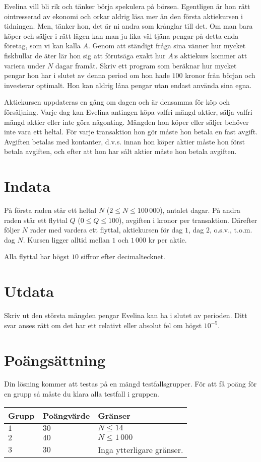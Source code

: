 Evelina vill bli rik och tänker börja spekulera på börsen.
Egentligen är hon rätt ointresserad av ekonomi och orkar aldrig läsa mer än den första aktiekursen i tidningen.
Men, tänker hon, det är ni andra som krånglar till det.
Om man bara köper och säljer i rätt lägen kan man ju lika väl tjäna pengar på detta enda företag, som vi kan kalla $A$.
Genom att ständigt fråga sina vänner hur mycket fiskbullar de äter lär hon sig att förutsäga exakt hur $A$:s aktiekurs kommer att variera under $N$ dagar framåt.
Skriv ett program som beräknar hur mycket pengar hon har i slutet av denna period om hon hade $100$ kronor från början och investerar optimalt.
Hon kan aldrig låna pengar utan endast använda sina egna.

Aktiekursen uppdateras en gång om dagen och är densamma för köp och försäljning.
Varje dag kan Evelina antingen köpa valfri mängd aktier, sälja valfri mängd aktier eller inte göra någonting.
Mängden hon köper eller säljer behöver inte vara ett heltal.
För varje transaktion hon gör måste hon betala en fast avgift.
Avgiften betalas med kontanter, d.v.s. innan hon köper aktier måste hon först betala avgiften, och efter att hon har sålt aktier måste hon betala avgiften. 

\section*{Indata}
På första raden står ett heltal $N$ ($2 \le N \le 100\,000$), antalet dagar.
På andra raden står ett flyttal $Q$ ($0 \le Q \le 100$), avgiften i kronor per transaktion.
Därefter följer $N$ rader med vardera ett flyttal, aktiekursen för dag $1$, dag $2$, o.s.v., t.o.m. dag $N$.
Kursen ligger alltid mellan $1$ och $1\,000$ kr per aktie. 

Alla flyttal har högst $10$ siffror efter decimaltecknet.

\section*{Utdata}
Skriv ut den största mängden pengar Evelina kan ha i slutet av perioden.
Ditt svar anses rätt om det har ett relativt eller absolut fel om högst $10^{-5}$.

\section*{Poängsättning}
Din lösning kommer att testas på en mängd testfallsgrupper.
För att få poäng för en grupp så måste du klara alla testfall i gruppen.

\noindent
\begin{tabular}{| l | l | p{12cm} |}
  \hline
  Grupp & Poängvärde & Gränser \\ \hline
  $1$    & $30$        & $N \le 14$ \\ \hline 
  $2$    & $40$        & $N \le 1\,000$ \\ \hline
  $3$    & $30$        & Inga ytterligare gränser. \\ \hline 
\end{tabular}
